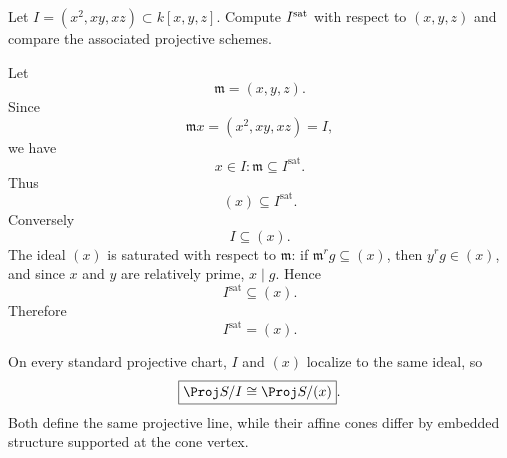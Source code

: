 \begin{problem}\label{prob:vi37-05}
Let \(I=(x^2,xy,xz)\subset k[x,y,z]\). Compute \(I^{\rm sat}\) with respect to \((x,y,z)\) and compare the associated projective schemes.
\end{problem}

\ifdefined\FullProblemDossiers
\begin{solution}
Let
\[
\mathfrak m=(x,y,z).
\]
Since
\[
\mathfrak m x=(x^2,xy,xz)=I,
\]
we have
\[
x\in I:\mathfrak m\subseteq I^{\mathrm{sat}}.
\]
Thus
\[
(x)\subseteq I^{\mathrm{sat}}.
\]
Conversely
\[
I\subseteq(x).
\]
The ideal \((x)\) is saturated with respect to \(\mathfrak m\): if \(\mathfrak m^r g\subseteq(x)\), then \(y^r g\in(x)\), and since \(x\) and \(y\) are relatively prime, \(x\mid g\). Hence
\[
I^{\mathrm{sat}}\subseteq(x).
\]
Therefore
\[
\boxed{I^{\mathrm{sat}}=(x)}.
\]

On every standard projective chart, \(I\) and \((x)\) localize to the same ideal, so
\[
\boxed{\Proj S/I\cong\Proj S/(x)}.
\]
Both define the same projective line, while their affine cones differ by embedded structure supported at the cone vertex.
\end{solution}
\fi
